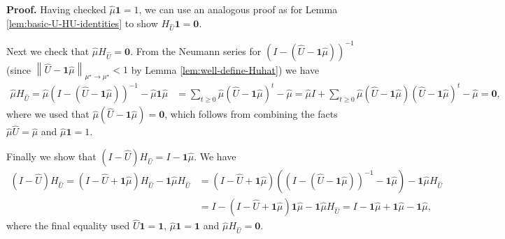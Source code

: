 \documentclass[10pt,a4paper]{amsart}
\renewenvironment{proof}[1]{\par\medskip\noindent\textbf{#1}\enspace\ignorespaces}{\par\medskip}
\def\ltwonorm#1{\left\lVert #1\right\rVert _{\mu^\star\to\mu^\star}}%
\newcommand{\muhat}{\widehat{\mu}}
\newcommand{\one}{\mathbf{1}}
\newcommand{\uhat}{\widehat{U}}
\newcommand{\zero}{\mathbf{0}}
\begin{document}
\begin{proof}{Proof.}
        Having checked $\muhat \one = 1$, we can use an analogous proof as for Lemma \ref{lem:basic-U-HU-identities} to show $H_{\uhat} \one = \zero$.

        Next we check that $\muhat H_{\uhat} = \zero$. From the Neumann series for $(I - (\uhat - \one \muhat))^{-1}$ (since $\ltwonorm{\uhat - \one \muhat}<1$ by Lemma \ref{lem:well-define-Huhat}) we have
        \begin{align*}
            \muhat H_{\uhat} 
            = \muhat (I - (\uhat - \one \muhat))^{-1} - \muhat \one \muhat 
            &= \sum_{t \geq 0} \muhat (\uhat - \one \muhat)^t - \muhat 
            = \muhat I  + \sum_{t \geq 0 }\muhat(\uhat - \one \muhat) (\uhat - \one \muhat)^t - \muhat 
            = \zero,
        \end{align*}
        where we used that $\muhat(\uhat - \one \muhat) = \zero$, which follows from combining the facts $\muhat \uhat = \muhat$ and $ \muhat\one=1$.

        Finally we show that $(I - \uhat)H_{\uhat} = I - \one \muhat$. We have
        \begin{align*}
        (I - \uhat)H_{\uhat} 
        = (I - \uhat + \one \muhat)H_{\uhat} - \one \muhat H_{\uhat}  
        &= (I - \uhat + \one \muhat) \left((I - (\uhat - \one \muhat))^{-1} - \one \muhat \right) - \one \muhat H_{\uhat} \\
        &= I - (I - \uhat + \one \muhat)\one \muhat  - \one \muhat H_{\uhat} 
        = I - \one \muhat+ \one \muhat - \one\muhat ,
    \end{align*}
    where the final equality used $\uhat \one = \one $, $\muhat \one = \one$ and $\muhat H_{\uhat} =\zero$.
    

\end{proof}
\end{document}
